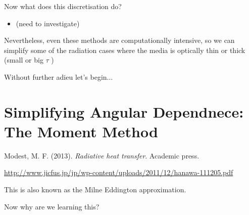 \documentclass[12pt]{article}
\renewcommand{\_}{\kern-1.5pt\textunderscore\kern-1.5pt}
\begin{document}
Now what does this discretisation do?\par

\begin{itemize}
	\item (need to investigate)\par

\end{itemize}

Nevertheless, even these methods are computationally intensive, so we can simplify some of the radiation cases where the media is optically thin or thick (small or big  \(  \tau \) )\par

Without further adieu let’s begin$ \ldots $ \par

\section*{Simplifying Angular Dependnece: The Moment Method }
{\fontsize{10pt}{12.0pt}\selectfont \textcolor[HTML]{222222}{Modest, M. F. (2013). \textit{Radiative heat transfer}. Academic press.}\par}\par

\href{http://www.jicfus.jp/jp/wp-content/uploads/2011/12/hanawa-111205.pdf}{http://www.jicfus.jp/jp/wp-content/uploads/2011/12/hanawa-111205.pdf}\par

This is also known as the Milne Eddington approximation.\par

Now why are we learning this? \par
\end{document}

